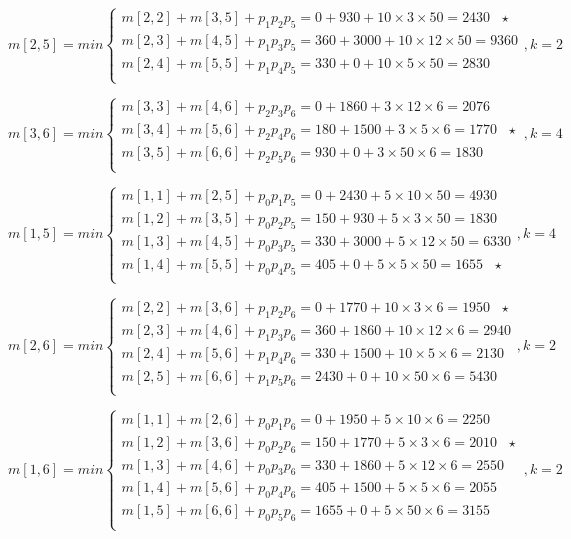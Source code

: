 \documentclass[19pt,a4paper]{article}
\begin{document}
$$m[2,5]=min\left\{
\begin{aligned}
m[2,2]+m[3,5]+p_1p_2p_5=0+930+10\times3\times50=2430\ \ \ \star\\
m[2,3]+m[4,5]+p_1p_3p_5=360+3000+10\times12\times50=9360\\
m[2,4]+m[5,5]+p_1p_4p_5=330+0+10\times5\times50=2830\\
\end{aligned}
\right.,k=2$$

$$m[3,6]=min\left\{
\begin{aligned}
m[3,3]+m[4,6]+p_2p_3p_6=0+1860+3\times12\times6=2076\\
m[3,4]+m[5,6]+p_2p_4p_6=180+1500+3\times5\times6=1770\ \ \ \star\\
m[3,5]+m[6,6]+p_2p_5p_6=930+0+3\times50\times6=1830\\
\end{aligned}
\right.,k=4$$

$$m[1,5]=min\left\{
\begin{aligned}
m[1,1]+m[2,5]+p_0p_1p_5=0+2430+5\times10\times50=4930\\
m[1,2]+m[3,5]+p_0p_2p_5=150+930+5\times3\times50=1830\\
m[1,3]+m[4,5]+p_0p_3p_5=330+3000+5\times12\times50=6330\\
m[1,4]+m[5,5]+p_0p_4p_5=405+0+5\times5\times50=1655\ \ \ \star\\
\end{aligned}
\right.,k=4$$

$$m[2,6]=min\left\{
\begin{aligned}
m[2,2]+m[3,6]+p_1p_2p_6=0+1770+10\times3\times6=1950\ \ \ \star\\
m[2,3]+m[4,6]+p_1p_3p_6=360+1860+10\times12\times6=2940\\
m[2,4]+m[5,6]+p_1p_4p_6=330+1500+10\times5\times6=2130\\
m[2,5]+m[6,6]+p_1p_5p_6=2430+0+10\times50\times6=5430\\
\end{aligned}
\right.,k=2$$

$$m[1,6]=min\left\{
\begin{aligned}
m[1,1]+m[2,6]+p_0p_1p_6=0+1950+5\times10\times6=2250\\
m[1,2]+m[3,6]+p_0p_2p_6=150+1770+5\times3\times6=2010\ \ \ \star\\
m[1,3]+m[4,6]+p_0p_3p_6=330+1860+5\times12\times6=2550\\
m[1,4]+m[5,6]+p_0p_4p_6=405+1500+5\times5\times6=2055\\
m[1,5]+m[6,6]+p_0p_5p_6=1655+0+5\times50\times6=3155\\
\end{aligned}
\right.,k=2$$
\end{document}
